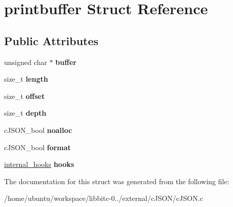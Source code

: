 \hypertarget{structprintbuffer}{\section{printbuffer Struct Reference}
\label{structprintbuffer}
}
\subsection*{Public Attributes}
\begin{DoxyCompactItemize}
\item 
\hypertarget{structprintbuffer_a754f63618e91db99f7ab6cfc4e629013}{unsigned char $\ast$ {\bfseries buffer}}\label{structprintbuffer_a754f63618e91db99f7ab6cfc4e629013}

\item 
\hypertarget{structprintbuffer_a1a679f8b6fe9b413fb3a87203b0f5bc8}{size\-\_\-t {\bfseries length}}\label{structprintbuffer_a1a679f8b6fe9b413fb3a87203b0f5bc8}

\item 
\hypertarget{structprintbuffer_a3ed6f9d24d6591047680492a962dc7c9}{size\-\_\-t {\bfseries offset}}\label{structprintbuffer_a3ed6f9d24d6591047680492a962dc7c9}

\item 
\hypertarget{structprintbuffer_aa7311b5da38ff8d1737824c611b48732}{size\-\_\-t {\bfseries depth}}\label{structprintbuffer_aa7311b5da38ff8d1737824c611b48732}

\item 
\hypertarget{structprintbuffer_aa2a7966b71dc3535e4e3789c33ec5368}{c\-J\-S\-O\-N\-\_\-bool {\bfseries noalloc}}\label{structprintbuffer_aa2a7966b71dc3535e4e3789c33ec5368}

\item 
\hypertarget{structprintbuffer_a75d3f480f5308e7f4afecf30e11277ef}{c\-J\-S\-O\-N\-\_\-bool {\bfseries format}}\label{structprintbuffer_a75d3f480f5308e7f4afecf30e11277ef}

\item 
\hypertarget{structprintbuffer_a43a8b3bcc644432f12f5aed5159d2520}{\hyperlink{structinternal__hooks}{internal\-\_\-hooks} {\bfseries hooks}}\label{structprintbuffer_a43a8b3bcc644432f12f5aed5159d2520}

\end{DoxyCompactItemize}


The documentation for this struct was generated from the following file\-:\begin{DoxyCompactItemize}
\item 
/home/ubuntu/workspace/libbitc-\/0../external/c\-J\-S\-O\-N/c\-J\-S\-O\-N.\-c\end{DoxyCompactItemize}
